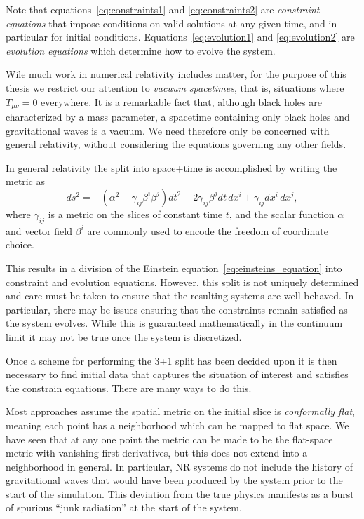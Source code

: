 Note that equations~\ref{eq:constraints1} and \ref{eq:constraints2}
are \emph{constraint equations} that impose conditions on valid
solutions at any given time, and in particular for initial conditions.
Equations~\ref{eq:evolution1} and \ref{eq:evolution2} are
\emph{evolution equations} which determine how to evolve the system.

Wile much work in numerical relativity includes matter, for the
purpose of this thesis  we restrict our attention to \emph{vacuum
spacetimes}, that is, situations where $T_{\mu\nu} = 0$ everywhere.
It is a remarkable fact that, although black holes are characterized
by a mass parameter, a spacetime containing only black holes and
gravitational waves is a vacuum.  We need therefore only be concerned
with general relativity, without considering the equations governing
any other fields.

In general relativity the split into space+time  is accomplished by
writing the metric as 
%
\begin{equation*}
ds^2 = -(\alpha^{2}-\gamma_{ij}\beta^{i}\beta^{j})dt^{2}
   + 2 \gamma_{ij}\beta^{j}dt\,dx^{i}
   + \gamma_{ij}dx^{i}\,dx^{j}, 
\end{equation*}
%
where $\gamma_{ij}$ is a metric on the slices of
constant time $t$, and the scalar function $\alpha$ and  
vector field $\beta^i$ are commonly used to encode the freedom of
coordinate choice. 

This results in a division of the Einstein
equation~\ref{eq:einsteins_equation} into constraint and evolution
equations.  However, this split is not uniquely determined and care
must be taken to ensure that the resulting systems are well-behaved.
In particular, there may be issues ensuring that the constraints
remain satisfied as the system evolves.  While this is guaranteed
mathematically in the continuum limit it may not be true once the
system is discretized.

Once a scheme for performing the 3+1 split has been decided upon it is
then necessary to find initial data that captures the situation of
interest and satisfies the constrain equations.  There are many ways
to do this.  

Most approaches assume the spatial metric on the initial slice is
\emph{conformally flat}, meaning each point has a neighborhood
which can be mapped to flat space.  We have seen that at any one point
the metric can be made to be the flat-space metric with vanishing
first derivatives, but this does not extend into a neighborhood in
general.  In particular, NR systems do not include the history of
gravitational waves that would have been produced by the system prior
to the start of the simulation.  This deviation from the true physics 
manifests as a burst of spurious ``junk radiation'' at the start of
the system.

